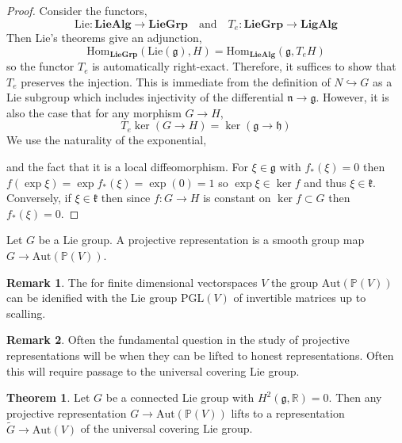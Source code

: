 \documentclass[12pt]{extarticle}
\newcommand{\Hom}[3]{\mathrm{Hom}_{#1}\left( #2, #3 \right)}
\newcommand{\R}{\mathbb{R}}
\theoremstyle{definition}
\newtheorem{theorem}{Theorem}[section]
\newtheorem{remark}{Remark}
\newenvironment{definition}[1][Definition:]{\begin{trivlist}
\item[\hskip \labelsep {\bfseries #1}]}{\end{trivlist}}
\newcommand{\PGL}[1]{\mathrm{PGL}\left(#1\right)}
\newcommand{\g}{\mathfrak{g}}
\newcommand{\h}{\mathfrak{h}}
\newcommand{\Lie}[1]{\mathrm{Lie}\left(#1 \right)}
\newcommand{\Aut}[1]{\mathrm{Aut}\left(#1 \right)}
\renewcommand{\P}{\mathbb{P}}
\newcommand{\embed}{\hookrightarrow}
\begin{document}
\begin{proof}
Consider the functors,
\[ \mathrm{Lie} : \mathbf{LieAlg} \to \mathbf{LieGrp}\quad \text{and} \quad T_e : \mathbf{LieGrp} \to \mathbf{LigAlg} \]
Then Lie's theorems give an adjunction,
\[ \Hom{\mathbf{LieGrp}}{\Lie{\g}}{H} = \Hom{\mathbf{LieAlg}}{\g}{T_e H} \]
so the functor $T_e$ is automatically right-exact. Therefore, it suffices to show that $T_e$ preserves the injection. This is immediate from the definition of $N \embed G$ as a Lie subgroup which includes injectivity of the differential $\mathfrak{n} \to \g$. However, it is also the case that for any morphism $G \to H$,
\[ T_e \ker{(G \to H)} = \ker{(\g \to \h)} \] 
We use the naturality of the exponential,
\begin{center}
\end{center}
and the fact that it is a local diffeomorphism. For $\xi \in \g$ with $f_*(\xi) = 0$ then $f(\exp{\xi}) = \exp{f_*(\xi)} = \exp{(0)} = 1$ so $\exp{\xi} \in \ker{f}$ and thus $\xi \in \mathfrak{k}$. Conversely, if $\xi \in \mathfrak{k}$ then since $f : G \to H$ is constant on $\ker{f} \subset G$ then $f_*(\xi) = 0$.  
\end{proof}

\begin{definition}
Let $G$ be a Lie group. A projective representation is a smooth group map $G \to \Aut{\P(V)}$. 
\end{definition}

\begin{remark}
The for finite dimensional vectorspaces $V$ the group $\Aut{\P(V)}$ can be idenified with the Lie group $\PGL{V}$ of invertible matrices up to scalling. 
\end{remark}

\begin{remark}
Often the fundamental question in the study of projective representations will be when they can be lifted to honest representations. Often this will require passage to the universal covering Lie group. 
\end{remark}

\begin{theorem}
Let $G$ be a connected Lie group with $H^2(\g, \R) = 0$. Then any projective representation $G \to \Aut{\P(V)}$ lifts to a representation $\tilde{G} \to \Aut{V}$ of the universal covering Lie group. 
\end{theorem}
\end{document}
